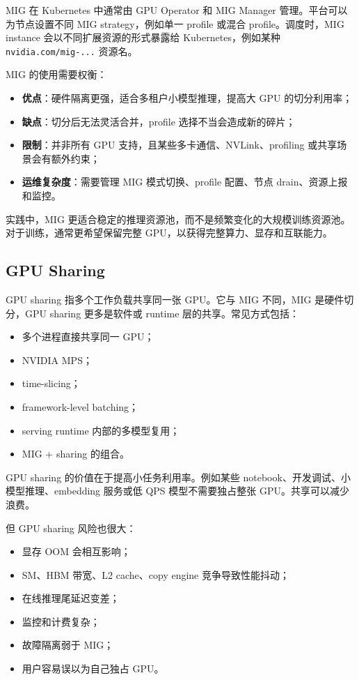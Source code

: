 MIG 在 Kubernetes 中通常由 GPU Operator 和 MIG Manager 管理。平台可以为节点设置不同 MIG strategy，例如单一 profile 或混合 profile。调度时，MIG instance 会以不同扩展资源的形式暴露给 Kubernetes，例如某种 \texttt{nvidia.com/mig-...} 资源名。

MIG 的使用需要权衡：

\begin{itemize}
  \item \textbf{优点}：硬件隔离更强，适合多租户小模型推理，提高大 GPU 的切分利用率；
  \item \textbf{缺点}：切分后无法灵活合并，profile 选择不当会造成新的碎片；
  \item \textbf{限制}：并非所有 GPU 支持，且某些多卡通信、NVLink、profiling 或共享场景会有额外约束；
  \item \textbf{运维复杂度}：需要管理 MIG 模式切换、profile 配置、节点 drain、资源上报和监控。
\end{itemize}

实践中，MIG 更适合稳定的推理资源池，而不是频繁变化的大规模训练资源池。对于训练，通常更希望保留完整 GPU，以获得完整算力、显存和互联能力。

\subsection{GPU Sharing}
\label{subsec:gpu-sharing}

GPU sharing 指多个工作负载共享同一张 GPU。它与 MIG 不同，MIG 是硬件切分，GPU sharing 更多是软件或 runtime 层的共享。常见方式包括：

\begin{itemize}
  \item 多个进程直接共享同一 GPU；
  \item NVIDIA MPS；
  \item time-slicing；
  \item framework-level batching；
  \item serving runtime 内部的多模型复用；
  \item MIG + sharing 的组合。
\end{itemize}

GPU sharing 的价值在于提高小任务利用率。例如某些 notebook、开发调试、小模型推理、embedding 服务或低 QPS 模型不需要独占整张 GPU。共享可以减少浪费。

但 GPU sharing 风险也很大：

\begin{itemize}
  \item 显存 OOM 会相互影响；
  \item SM、HBM 带宽、L2 cache、copy engine 竞争导致性能抖动；
  \item 在线推理尾延迟变差；
  \item 监控和计费复杂；
  \item 故障隔离弱于 MIG；
  \item 用户容易误以为自己独占 GPU。
\end{itemize}

